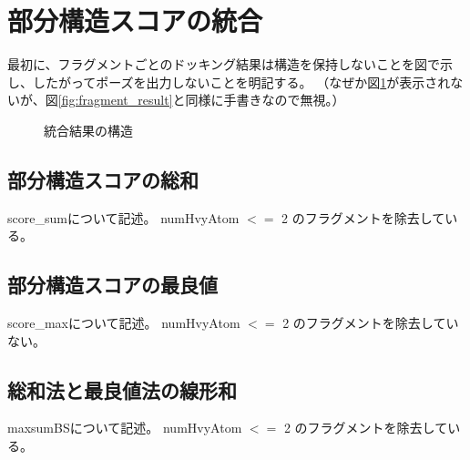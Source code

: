 \section{部分構造スコアの統合}
最初に、フラグメントごとのドッキング結果は構造を保持しないことを図で示し、したがってポーズを出力しないことを明記する。
（なぜか図\ref{fig:fragment_docking_result}が表示されないが、図\ref{fig:fragment_result}と同様に手書きなので無視。）
\begin{figure}[htp]
 \begin{center}
  \caption{統合結果の構造}
  \label{fig:fragment_docking_result}
 \end{center}
\end{figure}


\subsection{部分構造スコアの総和}
score\_sumについて記述。
numHvyAtom $<=$ 2 のフラグメントを除去している。
\subsection{部分構造スコアの最良値}
score\_maxについて記述。
numHvyAtom $<=$ 2 のフラグメントを除去していない。
\subsection{総和法と最良値法の線形和}
maxsumBSについて記述。
numHvyAtom $<=$ 2 のフラグメントを除去している。

